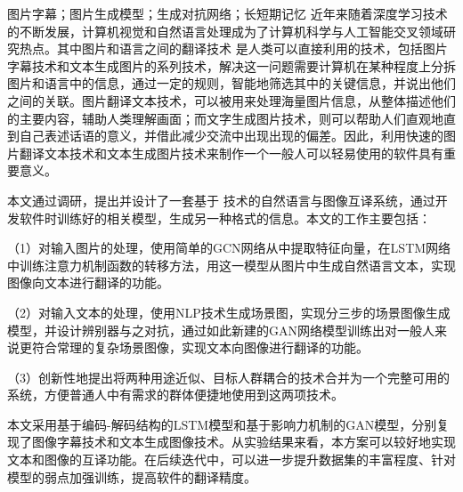 
\begin{cnabstract}{图片字幕；图片生成模型；生成对抗网络；长短期记忆}
  近年来随着深度学习技术的不断发展，计算机视觉和自然语言处理成为了计算机科学与人工智能交叉领域研究热点。其中图片和语言之间的翻译技术 是人类可以直接利用的技术，包括图片字幕技术和文本生成图片的系列技术，解决这一问题需要计算机在某种程度上分拆图片和语言中的信息，通过一定的规则，智能地筛选其中的关键信息，并说出他们之间的关联。图片翻译文本技术，可以被用来处理海量图片信息，从整体描述他们的主要内容，辅助人类理解画面；而文字生成图片技术，则可以帮助人们直观地直到自己表述话语的意义，并借此减少交流中出现出现的偏差。因此，利用快速的图片翻译文本技术和文本生成图片技术来制作一个一般人可以轻易使用的软件具有重要意义。

  本文通过调研，提出并设计了一套基于 技术的自然语言与图像互译系统，通过开发软件时训练好的相关模型，生成另一种格式的信息。本文的工作主要包括：

  （1）对输入图片的处理，使用简单的GCN网络从中提取特征向量，在LSTM网络中训练注意力机制函数的转移方法，用这一模型从图片中生成自然语言文本，实现图像向文本进行翻译的功能。

  （2）对输入文本的处理，使用NLP技术生成场景图，实现分三步的场景图像生成模型，并设计辨别器与之对抗，通过如此新建的GAN网络模型训练出对一般人来说更符合常理的复杂场景图像，实现文本向图像进行翻译的功能。

  （3）创新性地提出将两种用途近似、目标人群耦合的技术合并为一个完整可用的系统，方便普通人中有需求的群体便捷地使用到这两项技术。

  本文采用基于编码-解码结构的LSTM模型和基于影响力机制的GAN模型，分别复现了图像字幕技术和文本生成图像技术。从实验结果来看，本方案可以较好地实现文本和图像的互译功能。在后续迭代中，可以进一步提升数据集的丰富程度、针对模型的弱点加强训练，提高软件的翻译精度。
\end{cnabstract}

